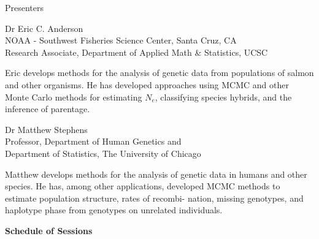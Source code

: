 
\vspace*{1in}
\begin{center}\color{section0}\bf\Large
\coursetitlepage
\end{center}
\es\bs
\begin{center}\color{section0} Presenters\end{center}
\enlargethispage*{1000pt}

{\color{section0}Dr Eric C. Anderson\\
NOAA - Southwest Fisheries Science Center, Santa Cruz, CA\\
Research Associate, Department of Applied Math \& Statistics, UCSC}

Eric develops methods for the analysis of genetic data from populations of salmon and other organisms.  He has developed approaches using MCMC and other Monte Carlo methods for estimating $N_e$, classifying species hybrids, and the inference of parentage.

{\color{section0}Dr Matthew Stephens\\
Professor, Department of Human Genetics and\\
Department of Statistics, The University of Chicago}
  
Matthew develops methods for the analysis of genetic data in humans and other species. He has, among other applications, developed MCMC methods to estimate population structure, rates of recombi- nation, missing genotypes, and haplotype phase from genotypes on unrelated individuals.

\es\bs
\begin{center}
{\color{section0}\bf\Large Schedule of Sessions}
\vspace*{.25in}
\enlargethispage*{1000pt}

%
%


\end{center}


